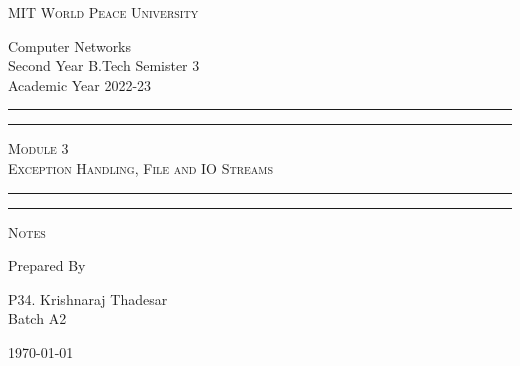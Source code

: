 \documentclass[11pt]{article}
\begin{document}
\begin{titlepage}
	\centering


	\huge\textsc{
		MIT World Peace University
	}\\

	\vspace{0.75\baselineskip} %

	\LARGE{
		Computer Networks\\
		Second Year B.Tech Semister 3\\
		Academic Year 2022-23
	}

	\vfill %


	\rule{\textwidth}{1.6pt}\vspace*{-\baselineskip}\vspace*{2pt}
	\rule{\textwidth}{0.6pt}
	\vspace{0.75\baselineskip} %



	\huge{\textsc{
			Module 3\\ Exception Handling, File and IO Streams
		}} \\



	\vspace{0.5\baselineskip} %
	\rule{\textwidth}{0.6pt}\vspace*{-\baselineskip}\vspace*{2.8pt}
	\rule{\textwidth}{1.6pt}

	\vspace{1\baselineskip} %


	\LARGE\textsc{
		Notes
	} %
	\vfill


	Prepared By
	\vspace{0.5\baselineskip} %

	\Large{
		P34. Krishnaraj Thadesar\\
		\vspace{1cm}
		Batch A2
	}


	\vspace{0.5\baselineskip} %
	\today

\end{titlepage}
\end{document}
